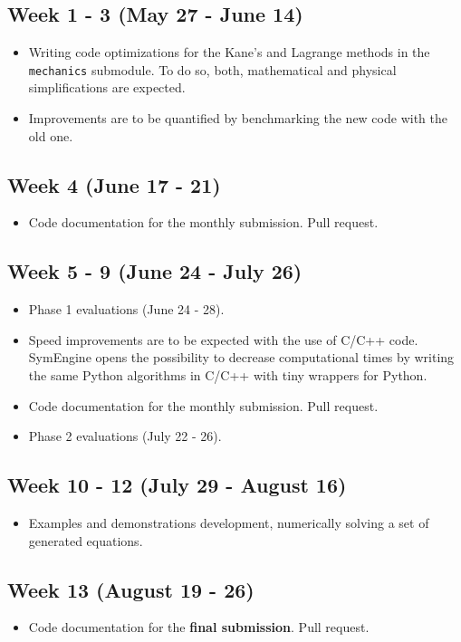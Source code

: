 \documentclass[12pt]{article}
\begin{document}
\subsection{Week 1 - 3 (May 27 - June 14)}
	\begin{itemize}
		\item Writing code optimizations for the Kane's and Lagrange methods in the \texttt{mechanics} submodule. To do so, both, mathematical and physical simplifications are expected.
		\item Improvements are to be quantified by benchmarking the new code with the old one.
	\end{itemize}
\subsection{Week 4 (June 17 - 21)}
	\begin{itemize}
		\item Code documentation for the monthly submission. Pull request.
	\end{itemize}

\subsection{Week 5 - 9 (June 24 - July 26)}
	\begin{itemize}
		\item Phase 1 evaluations (June 24 - 28).
		\item Speed improvements are to be expected with the use of C/C++ code. SymEngine opens the possibility to decrease computational times by writing the same Python algorithms in C/C++ with tiny wrappers for Python.
		\item Code documentation for the monthly submission. Pull request.
		\item Phase 2 evaluations (July 22 - 26).
	\end{itemize}
\subsection{Week 10 - 12 (July 29 - August 16)}
	\begin{itemize}
		\item Examples and demonstrations development, numerically solving a set of generated equations.
	\end{itemize}
\subsection{Week 13 (August 19 - 26)}
	\begin{itemize}
		\item Code documentation for the \textbf{final submission}. Pull request.
	\end{itemize}
\end{document}
